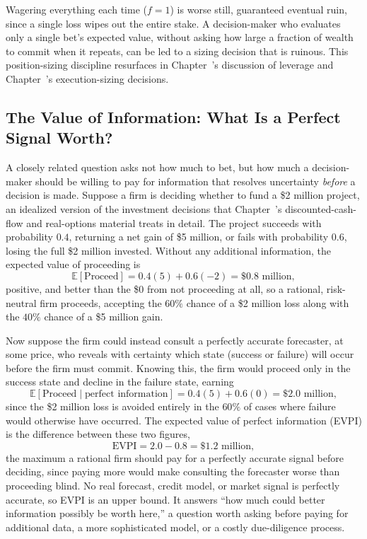 \documentclass[../ai_in_finance]{subfiles}
\begin{document}
Wagering everything each time ($f=1$) is worse still, guaranteed eventual ruin, since a single loss wipes out the entire stake. A decision-maker who evaluates only a single bet's expected value, without asking how large a fraction of wealth to commit when it repeats, can be led to a sizing decision that is ruinous. This position-sizing discipline resurfaces in Chapter~'s discussion of leverage and Chapter~'s execution-sizing decisions.

\subsection{The Value of Information: What Is a Perfect Signal Worth?}
\label{sec:value-of-information}

A closely related question asks not how much to bet, but how much a decision-maker should be willing to pay for information that resolves uncertainty \emph{before} a decision is made. Suppose a firm is deciding whether to fund a \$2 million project, an idealized version of the investment decisions that Chapter~'s discounted-cash-flow and real-options material treats in detail. The project succeeds with probability $0.4$, returning a net gain of \$5 million, or fails with probability $0.6$, losing the full \$2 million invested. Without any additional information, the expected value of proceeding is
\begin{equation*}
\mathbb{E}[\text{Proceed}] = 0.4(5) + 0.6(-2) = \$0.8 \text{ million},
\end{equation*}
positive, and better than the \$0 from not proceeding at all, so a rational, risk-neutral firm proceeds, accepting the $60\%$ chance of a \$2 million loss along with the $40\%$ chance of a \$5 million gain.

Now suppose the firm could instead consult a perfectly accurate forecaster, at some price, who reveals with certainty which state (success or failure) will occur before the firm must commit. Knowing this, the firm would proceed only in the success state and decline in the failure state, earning
\begin{equation*}
\mathbb{E}[\text{Proceed} \mid \text{perfect information}] = 0.4(5) + 0.6(0) = \$2.0 \text{ million},
\end{equation*}
since the \$2 million loss is avoided entirely in the $60\%$ of cases where failure would otherwise have occurred. The expected value of perfect information (EVPI) is the difference between these two figures,
\begin{equation*}
\text{EVPI} = 2.0 - 0.8 = \$1.2 \text{ million},
\end{equation*}
the maximum a rational firm should pay for a perfectly accurate signal before deciding, since paying more would make consulting the forecaster worse than proceeding blind. No real forecast, credit model, or market signal is perfectly accurate, so EVPI is an upper bound. It answers ``how much could better information possibly be worth here,'' a question worth asking before paying for additional data, a more sophisticated model, or a costly due-diligence process.
\end{document}
